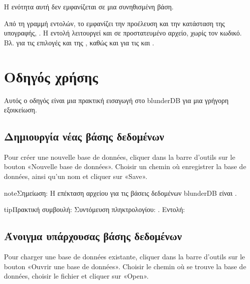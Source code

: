 \documentclass[letterpaper,10pt,greek]{sphinxmanual}
\begin{document}
\sphinxAtStartPar
Η ενότητα αυτή δεν εμφανίζεται σε μια συνηθισμένη βάση.

\sphinxAtStartPar
Από τη γραμμή εντολών, το  εμφανίζει την προέλευση και την κατάσταση της υπογραφής, . Η εντολή λειτουργεί και σε προστατευμένο αρχείο, χωρίς τον κωδικό. Βλ.  για τις επιλογές  και  της , καθώς και για τις  και .

\sphinxstepscope


\section{Οδηγός χρήσης}
\label{\detokenize{guide_utilisateur:guide-utilisateur}}\label{\detokenize{guide_utilisateur:id1}}\label{\detokenize{guide_utilisateur::doc}}
\sphinxAtStartPar
Αυτός ο οδηγός είναι μια πρακτική εισαγωγή στο blunderDB για μια γρήγορη εξοικείωση.


\subsection{Δημιουργία νέας βάσης δεδομένων}
\label{\detokenize{guide_utilisateur:creer-une-nouvelle-base-de-donnees}}
\sphinxAtStartPar
Pour créer une nouvelle base de données, cliquer dans la barre d’outils sur le
bouton «Nouvelle base de données». Choisir un chemin où enregistrer la base de
données, ainsi qu’un nom et cliquer sur «Save».

\begin{sphinxadmonition}{note}{Σημείωση:}
\sphinxAtStartPar
Η επέκταση αρχείου για τις βάσεις δεδομένων blunderDB είναι .
\end{sphinxadmonition}

\begin{sphinxadmonition}{tip}{Πρακτική συμβουλή:}
\sphinxAtStartPar
Συντόμευση πληκτρολογίου: . Εντολή: 
\end{sphinxadmonition}


\subsection{Άνοιγμα υπάρχουσας βάσης δεδομένων}
\label{\detokenize{guide_utilisateur:ouvrir-une-base-de-donnee-existante}}
\sphinxAtStartPar
Pour charger une base de données existante, cliquer dans la barre d’outils sur
le bouton «Ouvrir une base de données». Choisir le chemin où se trouve la base
de données, choisir le fichier  et cliquer sur «Open».
\end{document}
